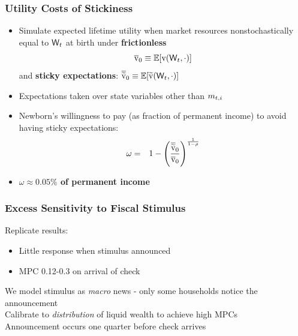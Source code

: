\documentclass{beamer}\usepackage{dcolumn}
\newcommand{\jbemph}[1]{\textbf{\color{SlideNavy}#1}}
\begin{document}
\begin{frame}
\frametitle{Utility Costs of Stickiness}

\begin{itemize}
\item  Simulate expected lifetime utility when market resources nonstochastically equal to $\mathsf{W}_t$ at birth under \jbemph{frictionless}
\begin{equation*}
\overline{\mathrm{v}}_0 \equiv \mathbb{E} [ \mathrm{v}(\mathsf{W}_t,\cdot)]
\end{equation*}
and \jbemph{sticky expectations}:
$ \displaystyle
\overline{\widetilde{\mathrm{v}}}_0 \equiv \mathbb{E} [ \widetilde{\mathrm{v}}(\mathsf{W}_t,\cdot)]
$
\item Expectations taken over state variables other than $m_{t,i}$
\item Newborn's
willingness to pay (as fraction of permanent income) to avoid having
sticky expectations:
\begin{eqnarray*}\label{eq:WTP}
\omega & = & 1 - \left( \frac{\overline{\widetilde{\mathrm{v}}}_0}{\overline{\mathrm{v}}_0} \right)^{\frac{1}{1-\rho}}
\end{eqnarray*}
\item \jbemph{$\omega \approx 0.05\%$ of permanent income}
\end{itemize}
\end{frame}

\begin{frame}
\frametitle{Excess Sensitivity to Fiscal Stimulus}
	Replicate \cite{psjmMPC2008} results:
	\begin{itemize}
		\item Little response when stimulus announced
		\item MPC 0.12-0.3 on arrival of check
	\end{itemize}
	We model stimulus as \textit{macro} news - only some households notice the announcement\\
	Calibrate to \textit{distribution} of liquid wealth to achieve high MPCs\\
	Announcement occurs one quarter before check arrives
\end{frame}
\end{document}
